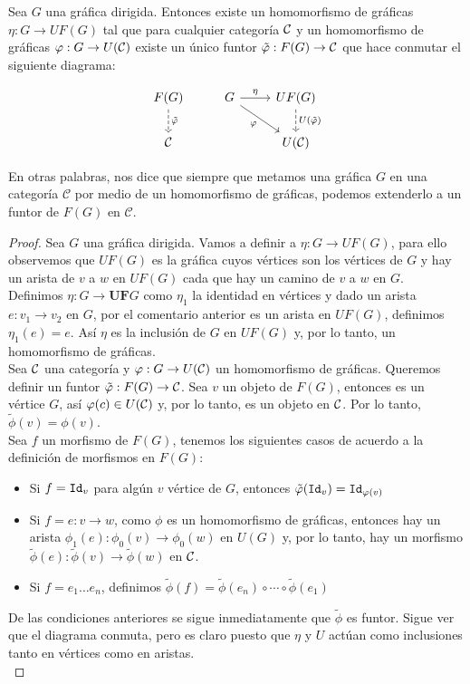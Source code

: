 \documentclass[../main.tex]{subfiles}
\begin{document}
\begin{prop}
	Sea $G$ una gráfica dirigida. Entonces existe un homomorfismo de gráficas $\eta:G \to UF(G)$ tal que para cualquier categoría $\cal{C}$ y un homomorfismo de gráficas $\phi: G \to U(\cal{C})$ existe un único funtor $\tilde\phi: F(G) \to \cal{C}$
	que hace conmutar el siguiente diagrama:
	
	\[
	\begin{tikzcd}
		F(G) \arrow[dashed]{d}{\tilde\phi}& G \arrow{r}{\eta} \arrow[swap]{rd}{\phi} & UF(G) \arrow[dashed]{d}{U(\tilde\phi)} \\
		\mathcal{C} & & U(\cal{C})
	\end{tikzcd}
	\] 	
\end{prop}

\noindent En otras palabras, nos dice que siempre que metamos una gráfica $G$ en una categoría $\mathcal{C}$ por medio de un homomorfismo de gráficas, podemos extenderlo a un funtor de $F(G)$ en $\mathcal{C}$.

\begin{proof}
    Sea $G$ una gráfica dirigida. Vamos a definir a $\eta:G \to UF(G)$, para ello observemos que $UF(G)$ es la gráfica cuyos vértices son los vértices de $G$ y hay un arista de $v$ a $w$ en $UF(G)$ cada que hay un camino de $v$ a $w$ en $G$. \\ 
	Definimos $\eta:G \to \mathbf{UF}G$ como $\eta_1$ la identidad en vértices y dado un arista $e:v_1 \to v_2$ en $G$, por el comentario anterior es un arista en $UF(G)$, definimos   $\eta_1(e)=e$. Así $\eta$ es la inclusión de $G$ en $UF(G)$ y, por lo tanto, un homomorfismo de gráficas. \\
    Sea $\cal{C}$ una categoría y $\varphi:G \to U(\cal{C})$ un homomorfismo de gráficas. Queremos definir un funtor $\tilde \phi : F(G) \to \cal{C}$.
    Sea $v$ un objeto de $F(G)$, entonces es un vértice $G$, así $\phi(c) \in U(\cal{C})$ y, por lo tanto, es un objeto en $\cal{C}$. Por lo tanto, $\tilde\phi (v) = \phi(v)$. \\
    Sea $f$ un morfismo de $F(G)$, tenemos los siguientes casos de acuerdo a la definición de morfismos en $F(G)$:
    \begin{itemize}
        \item Si $f=\id_v$ para algún $v$ vértice de $G$, entonces $\tilde\phi (\id_v) = \id_{\phi(v)}$
        \item Si $f=e: v \to w$, como $\phi$ es un homomorfismo de gráficas, entonces hay un arista $\phi_1(e): \phi_0(v) \to \phi_0(w)$ en $U(G)$ y, por lo tanto, hay un morfismo $\tilde\phi (e) :\tilde\phi(v) \to \tilde\phi(w)$ en $\cal{C}$. 
        \item Si $f=e_1 \dots e_n$, definimos $\tilde\phi(f)= \tilde\phi(e_n) \circ \cdots \circ \tilde\phi(e_1)$
    \end{itemize}
    De las condiciones anteriores se sigue inmediatamente que $\tilde \phi$ es funtor. Sigue ver que el diagrama conmuta, pero es claro puesto que $\eta$ y $U$ actúan como inclusiones tanto en vértices como en aristas. \\
\end{proof}
\end{document}
